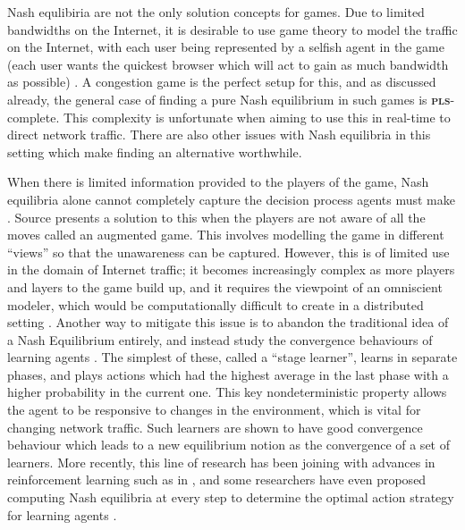 \documentclass{article}
\begin{document}
\begin{multicols}{2}
Nash equlibiria are not the only solution concepts for games. Due to limited bandwidths on the Internet, it is desirable to use game theory to model the traffic on the Internet, with each user being represented by a selfish agent in the game (each user wants the quickest browser which will act to gain as much bandwidth as possible) \cite{friedman_learning_nodate}. A congestion game is the perfect setup for this, and as discussed already, the general case of finding a pure Nash equilibrium in such games is \textbf{\textsc{pls}}-complete. This complexity is unfortunate when aiming to use this in real-time to direct network traffic. There are also other issues with Nash equilibria in this setting which make finding an alternative worthwhile.

When there is limited information provided to the players of the game, Nash equilibria alone cannot completely capture the decision process agents must make \cite{friedman_learning_nodate, beyond_nash}. Source \cite{beyond_nash} presents a solution to this when the players are not aware of all the moves called an augmented game. This involves modelling the game in different ``views'' so that the unawareness can be captured. However, this is of limited use in the domain of Internet traffic; it becomes increasingly complex as more players and layers to the game build up, and it requires the viewpoint of an omniscient modeler, which would be computationally difficult to create in a distributed setting \cite{friedman_learning_nodate}. Another way to mitigate this issue is to abandon the traditional idea of a Nash Equilibrium entirely, and instead study the convergence behaviours of learning agents \cite{friedman_learning_nodate}. The simplest of these, called a ``stage learner'', learns in separate phases, and plays actions which had the highest average in the last phase with a higher probability in the current one. This key nondeterministic property allows the agent to be responsive to changes in the environment, which is vital for changing network traffic. Such learners are shown to have good convergence behaviour which leads to a new equilibrium notion as the convergence of a set of learners. More recently, this line of research has been joining with advances in reinforcement learning such as in \cite{nowe_game_2012}, and some researchers have even proposed computing Nash equilibria at every step to determine the optimal action strategy for learning agents \cite{lee_nash_2019}.


\end{multicols}
\end{document}
